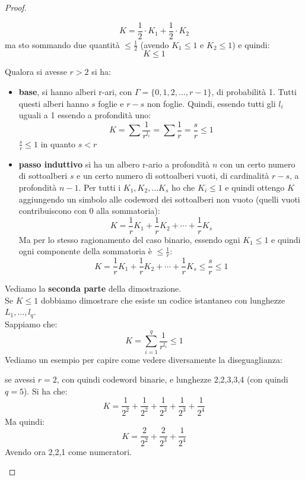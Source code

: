 \documentclass[a4paper,12pt, oneside]{book}
\begin{document}
\begin{proof}
\begin{itemize}
    \[K=\frac{1}{2}\cdot K_1+\frac{1}{2}\cdot K_2\]
    ma sto sommando due quantità $\leq \frac{1}{2}$ (avendo $K_1\leq 1$ e
    $K_2\leq 1$) e quindi: 
    \[K\leq 1\]
  \end{itemize}
  Qualora si avesse $r>2$ si ha:
  \begin{itemize}
    \item \textbf{base}, si hanno alberi r-ari, con
    $\Gamma=\{0,1,2,\ldots,r-1\}$, di probabilità 1. Tutti questi alberi hanno
    $s$ foglie e $r-s$ non foglie. Quindi, essendo tutti gli $l_i$ uguali a 1
    essendo a profondità uno:
    \[K=\sum \frac{1}{r^{l_i}}=\sum \frac{1}{r}=\frac{s}{r}\leq 1\]
    $\frac{s}{r}\leq 1$ in quanto $s<r$
    \item \textbf{passo induttivo} si ha un albero r-ario a profondità $n$ con
    un certo numero di sottoalberi $s$ e un certo numero di sottoalberi vuoti,
    di cardinalità $r-s$, a profondità $n-1$. Per tutti i $K_1,K_2,\ldots K_s$
    ho che $K_i\leq 1$ e quindi ottengo $K$ aggiungendo un simbolo alle codeword 
    dei sottoalberi non vuoto (quelli vuoti contribuiscono con 0 alla
    sommatoria): 
    \[K=\frac{1}{r}K_1+\frac{1}{r}K_2+\cdots+\frac{1}{r}K_s\]
    Ma per lo stesso ragionamento del caso binario, essendo ogni $K_1\leq 1$ e
    quindi ogni componente della sommatoria è $\leq \frac{1}{r}$:
    \[K=\frac{1}{r}K_1+\frac{1}{r}K_2+\cdots+\frac{1}{r}K_s\leq \frac{s}{r}\leq
      1\] 
  \end{itemize}
  Vediamo la \textbf{seconda parte} della dimostrazione.\\
  Se $K\leq 1$ dobbiamo dimostrare che esiste un codice istantaneo con lunghezze
  $L_1,\ldots, l_q$.\\
  Sappiamo che:
  \[K=\sum_{i=1}^q\frac{1}{r^{l_i}}\leq 1\]
  Vediamo un esempio per capire come vedere diversamente la diseguaglianza:
  \begin{esempio}
    se avessi $r=2$, con quindi codeword binarie, e lunghezze 2,2,3,3,4 (con
    quindi $q=5$). Si ha che: 
    \[K=\frac{1}{2^2}+\frac{1}{2^2}+\frac{1}{2^3}+\frac{1}{2^3}+\frac{1}{2^4}\]
    Ma quindi:
    \[K=\frac{2}{2^2}+\frac{2}{2^3}+\frac{1}{2^4}\]
    Avendo ora 2,2,1 come numeratori.
  \end{esempio}


\end{proof}
\end{document}
